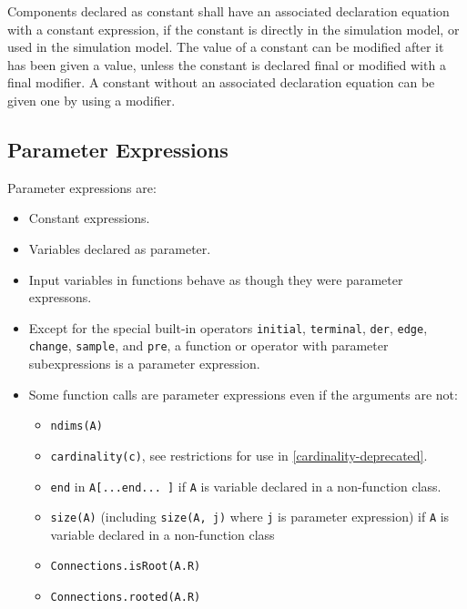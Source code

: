 Components declared as constant shall have an associated declaration
equation with a constant expression, if the constant is directly in the
simulation model, or used in the simulation model. The value of a
constant can be modified after it has been given a value, unless the
constant is declared final or modified with a final modifier. A constant
without an associated declaration equation can be given one by using a
modifier.

\subsection{Parameter Expressions}

Parameter expressions are:

\begin{itemize}
\item
  Constant expressions.
\item
  Variables declared as parameter.
\item
  Input variables in functions behave as though they were parameter expressons.
\item
  Except for the special built-in operators \lstinline!initial!, \lstinline!terminal!, \lstinline!der!,
  \lstinline!edge!, \lstinline!change!, \lstinline!sample!, and \lstinline!pre!, a function or operator with parameter
  subexpressions is a parameter expression.
\item
  Some function calls are parameter expressions even if the arguments
  are not:

  \begin{itemize}
  \item
    \lstinline!ndims(A)!
  \item
    \lstinline!cardinality(c)!, see restrictions for use in \autoref{cardinality-deprecated}.
  \item
    \lstinline!end! in \lstinline!A[...end... ]! if \lstinline!A! is variable declared in a  non-function class.
  \item
    \lstinline!size(A)! (including \lstinline!size(A, j)! where \lstinline!j! is parameter expression) if \lstinline!A!
    is variable declared in a non-function class
  \item
    \lstinline!Connections.isRoot(A.R)!
  \item
    \lstinline!Connections.rooted(A.R)!
  \end{itemize}
\end{itemize}

